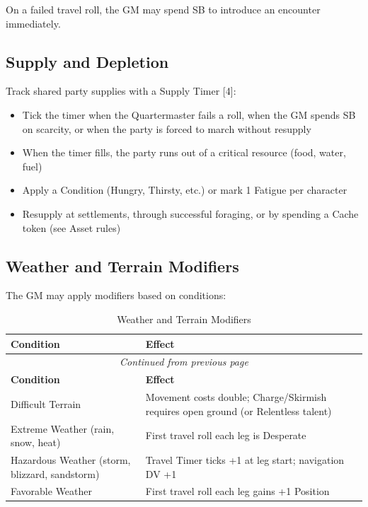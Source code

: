 On a failed travel roll, the GM may spend SB to introduce an encounter immediately.

\subsection{Supply and Depletion}
Track shared party supplies with a Supply Timer [4]:
\begin{itemize}
  \item Tick the timer when the Quartermaster fails a roll, when the GM spends SB on scarcity, or when the party is forced to march without resupply
  \item When the timer fills, the party runs out of a critical resource (food, water, fuel)
  \item Apply a Condition (Hungry, Thirsty, etc.) or mark 1 Fatigue per character
  \item Resupply at settlements, through successful foraging, or by spending a Cache token (see Asset rules)
\end{itemize}

\subsection{Weather and Terrain Modifiers}
The GM may apply modifiers based on conditions:

\begin{center}
\begin{longtable}{ll}
\caption{Weather and Terrain Modifiers}\\
\toprule
\textbf{Condition} & \textbf{Effect} \\
\midrule
\endfirsthead
\multicolumn{2}{c}{\emph{Continued from previous page}} \\
\toprule
\textbf{Condition} & \textbf{Effect} \\
\midrule
\endhead
\bottomrule
\endfoot
Difficult Terrain & Movement costs double; Charge/Skirmish requires open ground (or Relentless talent) \\
Extreme Weather (rain, snow, heat) & First travel roll each leg is Desperate \\
Hazardous Weather (storm, blizzard, sandstorm) & Travel Timer ticks +1 at leg start; navigation DV +1 \\
Favorable Weather & First travel roll each leg gains +1 Position \\
\end{longtable}
\end{center}

